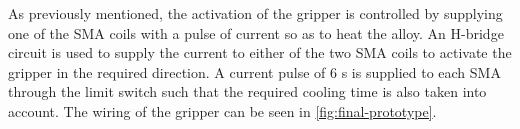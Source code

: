 As previously mentioned, the activation of the gripper is controlled by supplying one of the SMA coils with a pulse of current so as to heat the alloy. An H-bridge circuit is used to supply the current to either of the two SMA coils to activate the gripper in the required direction. A current pulse of $6$ s is supplied to each SMA through the limit switch such that the required cooling time is also taken into account. The wiring of the gripper can be seen in \cref{fig:final-prototype}.

\begin{figure}[hbt!] %
  \centering
  \begin{subfigure}[b]{0.27\textwidth}
\end{subfigure}
\end{figure}
